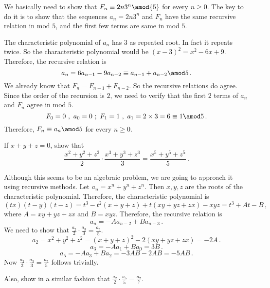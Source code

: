 \documentclass[11pt]{scrartcl}
\begin{document}
\begin{soln}
We basically need to show that \(F_n \equiv 2n 3^n \amod{5}\) for every \(n \ge 0\). The key to do it is to show that the sequences \(a_n = 2n 3^n\) and \(F_n\) have the same recursive relation in mod \(5\), and the first few terms are same in mod \(5\).

The characteristic polynomial of \(a_n\) has \(3\) as repeated root. In fact it repeats twice. So the characteristic polynomial would be \(\left(x-3\right) ^2 = x^2 -6x +9\). Therefore, the recursive relation is
\[ a_n = 6a_{n-1} - 9 a_{n-2} \equiv a_{n-1} + a_{n-2} \amod 5 \, . \]
We already know that \(F_n = F_{n-1}+ F_{n-2}\). So the recursive relations do agree. Since the order of the recursion is \(2\), we need to verify that the first \(2\) terms of \(a_n\) and \(F_n\) agree in mod \(5\).
\[ F_0 = 0 \ , \ a_0 = 0 \ ; \ F_1 = 1 \ , \ a_1 = 2 \times 3 = 6 \equiv 1 \amod 5 \, . \]
Therefore, \(F_n \equiv a_n \amod 5\) for every \(n \ge 0\).
\end{soln}
\begin{exercise}
If \(x+y+z = 0\), show that
\[ \frac{x^2 + y^2 + z^2}{2} \cdot \frac{x^3 + y^3 + z^3}{3} = \frac{x^5 + y^5 + z^5}{5} \, . \]
\end{exercise}
\begin{soln}
Although this seems to be an algebraic problem, we are going to approach it using recursive methods. Let \(a_n = x^n + y^n + z^n\). Then \(x,y,z\) are the roots of the characteristic polynomial. Therefore, the characteristic polynomial is
\[ \left(tx\right) \left(t-y\right) \left(t-z\right) = t^3 - t^2 \left(x+y+z\right) + t \left(xy+yz+zx\right) - xyz = t^3+At-B \, , \]
where \(A =xy+yz+zx \) and \(B=xyz\). Therefore, the recursive relation is
\[ a_n = -A a_{n-2} + Ba_{n-3} \, . \]
We need to show that \(\frac{a_2}{2}\cdot \frac{a_3}{3} = \frac{a_5}{5}\).
\[ a_2 = x^2 + y^2 + z^2 = \left(x+y+z\right) ^2 - 2 \left(xy+yz+zx\right) = -2A \, . \]
\[ a_3 = -A a_{1} + Ba_{0} = 3B \, . \]
\[ a_5 = -A a_{3} + Ba_{2} = - 3AB - 2AB = -5AB \, . \]
Now \(\frac{a_2}{2}\cdot \frac{a_3}{3} = \frac{a_5}{5}\) follows trivially.
\end{soln}
Also, show in a similar fashion that \(\frac{a_2}{2}\cdot \frac{a_5}{5} = \frac{a_7}{7}\).
\end{document}
